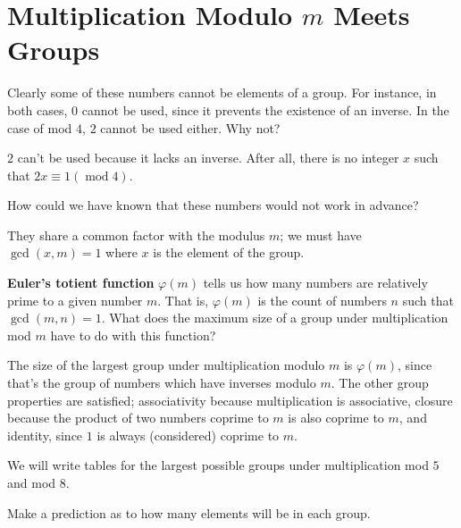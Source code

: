 \documentclass[../gatm_answers.tex]{subfiles}
\begin{document}
\section{Multiplication Modulo $m$ Meets Groups}

\begin{outer_problem}[start=1]
\item Clearly some of these numbers cannot be elements of a group. For instance, in both cases, $0$ cannot be used, since it prevents the existence of an inverse. In the case of mod $4$, $2$ cannot be used either. Why not?
\end{outer_problem}

$2$ can't be used because it lacks an inverse. After all, there is no integer $x$ such that $2x\equiv 1 (\operatorname{mod} 4)$.

\begin{outer_problem}
\item How could we have known that these numbers would not work in advance?
\end{outer_problem}

They share a common factor with the modulus $m$; we must have $\gcd(x,m)=1$ where $x$ is the element of the group.

\begin{outer_problem}
\item \textbf{Euler's totient function} $\varphi(m)$ tells us how many numbers are relatively prime to a given number $m$. That is, $\varphi(m)$ is the count of numbers $n$ such that $\gcd(m,n)=1$. What does the maximum size of a group under multiplication mod $m$ have to do with this function?
\end{outer_problem}

The size of the largest group under multiplication modulo $m$ is $\varphi(m)$, since that's the group of numbers which have inverses modulo $m$. The other group properties are satisfied; associativity because multiplication is associative, closure because the product of two numbers coprime to $m$ is also coprime to $m$, and identity, since $1$ is always (considered) coprime to $m$.

\begin{outer_problem}
\item We will write tables for the largest possible groups under multiplication mod $5$ and mod $8$.
\end{outer_problem}

\begin{inner_problem}[start=1]
\item Make a prediction as to how many elements will be in each group.
\end{inner_problem}
\end{document}
